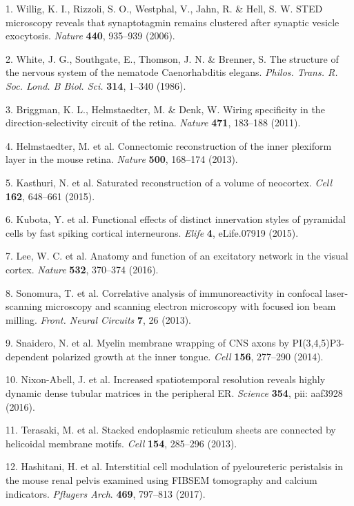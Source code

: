 \documentclass{article}
\begin{document}
\begin{hangpars}\small
1. Willig, K. I., Rizzoli, S. O., Westphal, V., Jahn, R. \& Hell, S. W. STED microscopy reveals that synaptotagmin remains clustered after synaptic vesicle exocytosis. \emph{Nature} \textbf{440}, 935–939 (2006).

2. White, J. G., Southgate, E., Thomson, J. N. \& Brenner, S. The structure of the nervous system of the nematode Caenorhabditis elegans. \emph{Philos. Trans. R. Soc. Lond. B Biol. Sci.} \textbf{314}, 1–340 (1986).

3. Briggman, K. L., Helmstaedter, M. \& Denk, W. Wiring specificity in the direction-selectivity circuit of the retina. \emph{Nature} \textbf{471}, 183–188 (2011).

4. Helmstaedter, M. et al. Connectomic reconstruction of the inner plexiform layer in the mouse retina. \emph{Nature} \textbf{500}, 168–174 (2013).

5. Kasthuri, N. et al. Saturated reconstruction of a volume of neocortex. \emph{Cell} \textbf{162}, 648–661 (2015).

6. Kubota, Y. et al. Functional effects of distinct innervation styles of pyramidal cells by fast spiking cortical interneurons. \emph{Elife} \textbf{4}, eLife.07919 (2015).

7. Lee, W. C. et al. Anatomy and function of an excitatory network in the visual cortex. \emph{Nature} \textbf{532}, 370–374 (2016).

8. Sonomura, T. et al. Correlative analysis of immunoreactivity in confocal laser-scanning microscopy and scanning electron microscopy with focused ion beam milling. \emph{Front. Neural Circuits} \textbf{7}, 26 (2013).

9. Snaidero, N. et al. Myelin membrane wrapping of CNS axons by PI(3,4,5)P3-dependent polarized growth at the inner tongue. \emph{Cell} \textbf{156}, 277–290 (2014).

10. Nixon-Abell, J. et al. Increased spatiotemporal resolution reveals highly dynamic dense tubular matrices in the peripheral ER. \emph{Science} \textbf{354}, pii: aaf3928 (2016).

11. Terasaki, M. et al. Stacked endoplasmic reticulum sheets are connected by helicoidal membrane motifs. \emph{Cell} \textbf{154}, 285–296 (2013).

12. Hashitani, H. et al. Interstitial cell modulation of pyeloureteric peristalsis in the mouse renal pelvis examined using FIBSEM tomography and calcium indicators. \emph{Pflugers Arch}. \textbf{469}, 797–813 (2017).


\end{hangpars}
\end{document}
